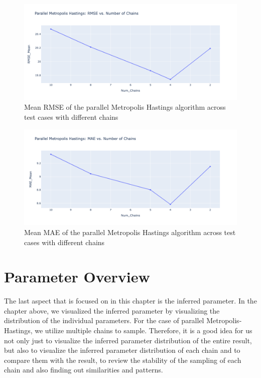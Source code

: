 \begin{figure}[H]
    \centering
    \includegraphics[width=1\textwidth]{figures/parallel_mh/rmse.png}
    \captionsetup{width=.8\textwidth}
    \caption{Mean RMSE of the parallel Metropolis Hastings algorithm across test cases with different chains}
    \label{fig:enter-label}
\end{figure}

\begin{figure}[H]
    \centering
    \includegraphics[width=1\textwidth]{figures/parallel_mh/mae.png}
    \captionsetup{width=.8\textwidth}
    \caption{Mean MAE of the parallel Metropolis Hastings algorithm across test cases with different chains}
    \label{fig:enter-label}
\end{figure}

\section{Parameter Overview}
The last aspect that is focused on in this chapter is the inferred parameter. In the chapter above, we visualized the inferred parameter by visualizing the distribution of the individual parameters. For the case of parallel Metropolis-Hastings, we utilize multiple chains to sample. Therefore, it is a good idea for us not only just to visualize the inferred parameter distribution of the entire result, but also to visualize the inferred parameter distribution of each chain and to compare them with the result, to review the stability of the sampling of each chain and also finding out similarities and patterns.

